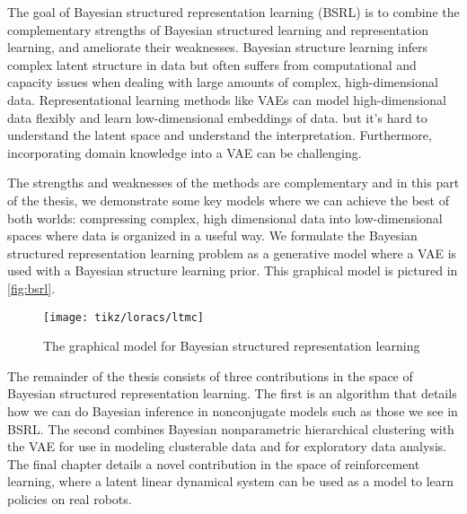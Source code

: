 The goal of Bayesian structured
representation learning (BSRL)
is to combine the complementary 
strengths of
Bayesian structured learning
and representation learning,
and ameliorate their weaknesses.
Bayesian structure learning
infers complex latent structure
in data but often suffers from
computational and capacity issues
when dealing with large amounts of
complex, high-dimensional data.
Representational learning methods
like VAEs can model high-dimensional
data
flexibly
and learn low-dimensional
embeddings of data.
but it's hard to understand the
latent space and understand the interpretation.
Furthermore, incorporating
domain knowledge into a VAE
can be challenging.

The strengths and weaknesses of 
the methods are complementary
and in this part of the thesis, we demonstrate
some key models where we can
achieve the best of both worlds:
compressing complex, high dimensional
data into low-dimensional spaces
where data is organized in a useful way.
We formulate the Bayesian structured
representation learning problem
as a generative model
where a VAE is used
with a Bayesian structure learning prior.
This graphical model is pictured in 
\autoref{fig:bsrl}.

\begin{figure}[H]
    \centering
    \texttt{[image: tikz/loracs/ltmc]}
    \caption{The graphical model for
    Bayesian structured representation learning}
    \label{fig:bsrl}
\end{figure}

The remainder of the thesis
consists of three
contributions in the space of Bayesian
structured representation learning.
The first
is an algorithm that details how
we can do Bayesian inference in
nonconjugate models
such as those we see in BSRL.
The second combines Bayesian nonparametric
hierarchical clustering with
the VAE for use in modeling
clusterable data and for exploratory data analysis.
The final chapter details a novel
contribution in the space
of reinforcement learning, where
a latent linear dynamical system
can be used as a model to learn
policies on real robots.